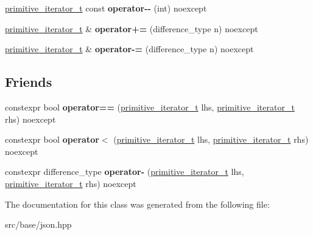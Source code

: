 \begin{DoxyCompactItemize}
\mbox{\hyperlink{classnlohmann_1_1detail_1_1primitive__iterator__t}{primitive\+\_\+iterator\+\_\+t}} const {\bfseries operator-\/-\/} (int) noexcept
\item 
\mbox{\label{classnlohmann_1_1detail_1_1primitive__iterator__t_aee01535df0b3b40137d9241029a9a203}} 
\mbox{\hyperlink{classnlohmann_1_1detail_1_1primitive__iterator__t}{primitive\+\_\+iterator\+\_\+t}} \& {\bfseries operator+=} (difference\+\_\+type n) noexcept
\item 
\mbox{\label{classnlohmann_1_1detail_1_1primitive__iterator__t_a0bf83ab08abe1ae4b51c790c85cdf151}} 
\mbox{\hyperlink{classnlohmann_1_1detail_1_1primitive__iterator__t}{primitive\+\_\+iterator\+\_\+t}} \& {\bfseries operator-\/=} (difference\+\_\+type n) noexcept
\end{DoxyCompactItemize}
\subsection*{Friends}
\begin{DoxyCompactItemize}
\item 
\mbox{\label{classnlohmann_1_1detail_1_1primitive__iterator__t_aae1e1e2ec0e229d1291d69de57d76bbe}} 
constexpr bool {\bfseries operator==} (\mbox{\hyperlink{classnlohmann_1_1detail_1_1primitive__iterator__t}{primitive\+\_\+iterator\+\_\+t}} lhs, \mbox{\hyperlink{classnlohmann_1_1detail_1_1primitive__iterator__t}{primitive\+\_\+iterator\+\_\+t}} rhs) noexcept
\item 
\mbox{\label{classnlohmann_1_1detail_1_1primitive__iterator__t_a901a95e6d73c9509d3dcde914f6c8a9d}} 
constexpr bool {\bfseries operator$<$} (\mbox{\hyperlink{classnlohmann_1_1detail_1_1primitive__iterator__t}{primitive\+\_\+iterator\+\_\+t}} lhs, \mbox{\hyperlink{classnlohmann_1_1detail_1_1primitive__iterator__t}{primitive\+\_\+iterator\+\_\+t}} rhs) noexcept
\item 
\mbox{\label{classnlohmann_1_1detail_1_1primitive__iterator__t_ac6d902d6ec9a02dabed5452d3ae78f7e}} 
constexpr difference\+\_\+type {\bfseries operator-\/} (\mbox{\hyperlink{classnlohmann_1_1detail_1_1primitive__iterator__t}{primitive\+\_\+iterator\+\_\+t}} lhs, \mbox{\hyperlink{classnlohmann_1_1detail_1_1primitive__iterator__t}{primitive\+\_\+iterator\+\_\+t}} rhs) noexcept
\end{DoxyCompactItemize}


The documentation for this class was generated from the following file\+:\begin{DoxyCompactItemize}
\item 
src/base/json.\+hpp\end{DoxyCompactItemize}
